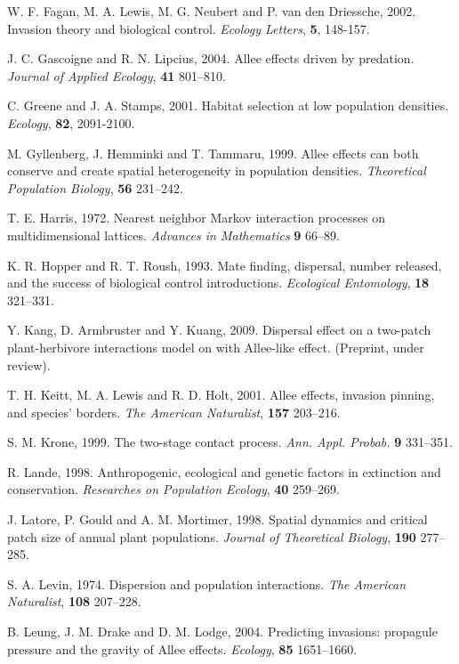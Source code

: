 \begin{thebibliography}{10}
W. F. Fagan, M. A. Lewis, M. G. Neubert and P. van den Driessche, 2002. Invasion theory and biological control. \emph{Ecology Letters}, \textbf{5}, 148-157. 

 J. C. Gascoigne and R. N. Lipcius, 2004.
 Allee effects driven by predation.
\emph{Journal of Applied Ecology}, \textbf{41} 801--810.

C. Greene and J. A. Stamps, 2001. Habitat selection at low population densities. \emph{Ecology}, \textbf{82}, 2091-2100.

 M. Gyllenberg, J. Hemminki and T. Tammaru, 1999.
 Allee effects can both conserve and create spatial heterogeneity in population densities.
\emph{Theoretical Population Biology}, \textbf{56} 231--242.

 T. E. Harris, 1972.
 Nearest neighbor Markov interaction processes on multidimensional lattices.
\emph{Advances in Mathematics} \textbf{9} 66--89.

 K. R. Hopper and R. T. Roush, 1993.
 Mate finding, dispersal, number released, and the success of biological control introductions.
\emph{Ecological Entomology}, \textbf{18} 321--331.

 Y. Kang, D. Armbruster and Y. Kuang, 2009.
 Dispersal effect on a two-patch plant-herbivore interactions model on with Allee-like effect.
 (Preprint, under review).

 T. H. Keitt, M. A. Lewis and R. D. Holt, 2001.
 Allee effects, invasion pinning, and species' borders.
\emph{The American Naturalist}, \textbf{157} 203--216.

 S. M. Krone, 1999.
 The two-stage contact process.
\emph{Ann. Appl. Probab.} \textbf{9} 331--351.

 R. Lande, 1998.
 Anthropogenic, ecological and genetic factors in extinction and conservation.
\emph{Researches on Population Ecology}, \textbf{40} 259--269.

 J. Latore, P. Gould and A. M. Mortimer, 1998.
 Spatial dynamics and critical patch size of annual plant populations.
\emph{Journal of Theoretical Biology}, \textbf{190} 277--285.

 S. A. Levin, 1974.
 Dispersion and population interactions.
\emph{The American Naturalist}, \textbf{108} 207--228.

 B. Leung, J. M. Drake and D. M. Lodge, 2004.
 Predicting invasions: propagule pressure and the gravity of Allee effects.
\emph{Ecology}, \textbf{85} 1651--1660.


\end{thebibliography}

